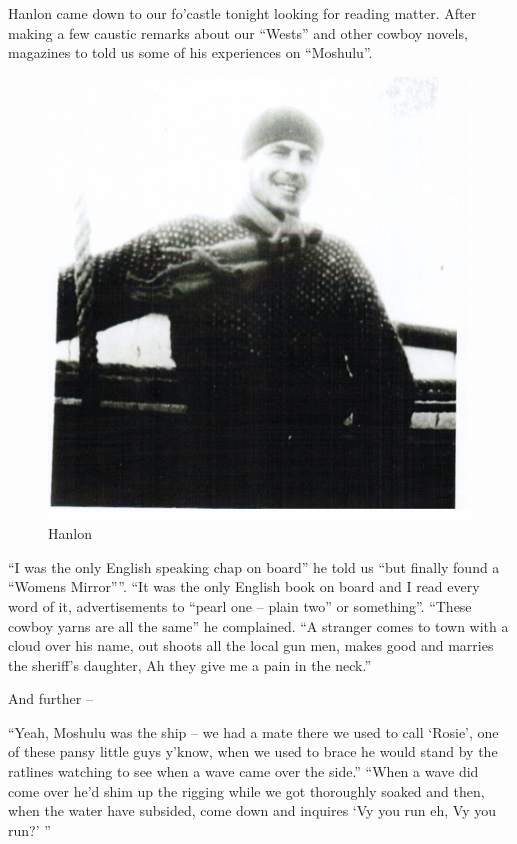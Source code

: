 \documentclass[
  11pt,
  msmallroyalvopaper
]{memoir}
\begin{document}
Hanlon came down to our fo'castle tonight looking for reading matter.
After making a few caustic remarks about our ``Wests'' and other cowboy
novels, magazines to told us some of his experiences on ``Moshulu''.

\begin{figure}
\centering
\includegraphics{./images/image005.jpg}
\caption{Hanlon}
\end{figure}

``I was the only English speaking chap on board'' he told us ``but
finally found a ``Womens Mirror''''. ``It was the only English book on board
and I read every word of it, advertisements to ``pearl one -- plain
two'' or something''. ``These cowboy yarns are all the same'' he
complained. ``A stranger comes to town with a cloud over his name, out
shoots all the local gun men, makes good and marries the sheriff's
daughter, Ah they give me a pain in the neck.''

And further --

``Yeah, Moshulu was the ship -- we had a mate there we used to call
`Rosie', one of these pansy little guys y'know, when we used to brace he
would stand by the ratlines watching to see when a wave came over the
side.'' ``When a wave did come over he'd shim up the rigging while we
got thoroughly soaked and then, when the water have subsided, come down
and inquires `Vy you run eh, Vy you run?' ''
\end{document}
